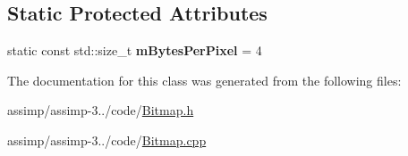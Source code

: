 \subsection*{Static Protected Attributes}
\begin{DoxyCompactItemize}
\item 
\hypertarget{class_assimp_1_1_bitmap_a2f4b251565f53c5eeae61f807483c2d2}{static const std\+::size\+\_\+t {\bfseries m\+Bytes\+Per\+Pixel} = 4}\label{class_assimp_1_1_bitmap_a2f4b251565f53c5eeae61f807483c2d2}

\end{DoxyCompactItemize}


The documentation for this class was generated from the following files\+:\begin{DoxyCompactItemize}
\item 
assimp/assimp-\/3../code/\hyperlink{_bitmap_8h}{Bitmap.\+h}\item 
assimp/assimp-\/3../code/\hyperlink{_bitmap_8cpp}{Bitmap.\+cpp}\end{DoxyCompactItemize}
